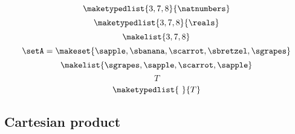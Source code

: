 \begin{forslides}
    \begin{equation}\label{eq:slides_session2_41}
        \maketypedlist{3, 7, 8}{\natnumbers}
    \end{equation}
    \begin{equation}\label{eq:slides_session2_42}
        \maketypedlist{3, 7, 8}{\reals}
    \end{equation}
    \begin{equation}\label{eq:slides_session2_43}
        \makelist{3, 7, 8}
    \end{equation}
    \begin{equation}\label{eq:slides_session2_44}
        \setA = \makeset{\sapple, \sbanana, \scarrot, \sbretzel, \sgrapes}
    \end{equation}
    \begin{equation}\label{eq:slides_session2_45}
        \makelist{\sgrapes, \sapple, \scarrot, \sapple}
    \end{equation}
    \begin{equation}\label{eq:slides_session2_46}
        T
    \end{equation}
    \begin{equation}\label{eq:slides_session2_47}
        \maketypedlist{\ }{T}
    \end{equation}

    \subsection{Cartesian product}


\end{forslides}
